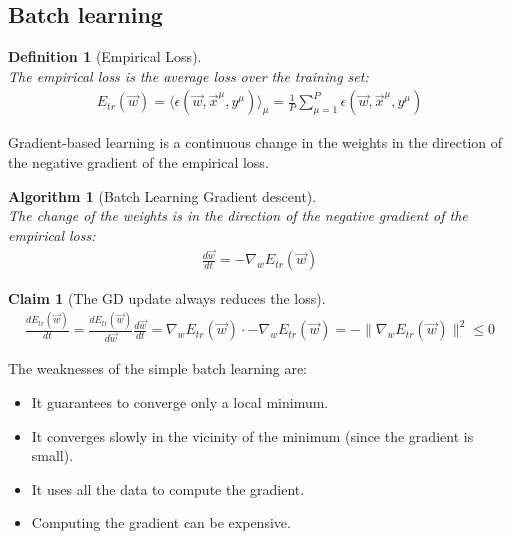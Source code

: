 \documentclass[11pt]{book} %
\newtheorem{definition}{Definition}[section]
\newtheorem{algorithm}{Algorithm}[section]
\newtheorem*{claim*}{Claim}
\begin{document}
%
%

\subsection{Batch learning}

\begin{definition}[Empirical Loss]\ \\
    The empirical loss is the average loss over the training set:
    \begin{align}
        E_{tr}(\vec{w}) = \langle \epsilon(\vec{w}, \vec{x}^\mu, y^\mu ) \rangle_\mu =\frac{1}{P} \sum_{\mu=1}^{P} \epsilon (\vec{w}, \vec{x}^\mu, y^\mu)
    \end{align}
\end{definition}

Gradient-based learning is a continuous change in the weights in the direction of the negative gradient of the empirical loss.
\begin{algorithm}[Batch Learning Gradient descent]\ \\
    The change of the weights is in the direction of the negative gradient of the empirical loss:
    \begin{align}
        \frac {d \vec{w}}{dt} =  - \nabla_w E_{tr}(\vec{w})
    \end{align}
    
\end{algorithm}

\begin{claim*}[The GD update always reduces the loss]\ \\
    \begin{align}
        \frac{d E_{tr}(\vec{w})}{dt} = \frac{dE_{tr}(\vec{w})}{d\vec{w}}  \frac{d\vec{w}}{dt} = 
        \nabla_w E_{tr}(\vec{w}) \cdot -\nabla_w E_{tr}(\vec{w}) =  - \lVert \nabla_w E_{tr}(\vec{w}) \rVert^2 \leq 0
    \end{align}
\end{claim*}

The weaknesses of the simple batch learning are:
\begin{itemize}
    \item It guarantees to converge only a local minimum.
    \item It converges slowly in the vicinity of the minimum (since the gradient is small).
    \item It uses all the data to compute the gradient.
    \item Computing the gradient can be expensive.
\end{itemize}
\end{document}
